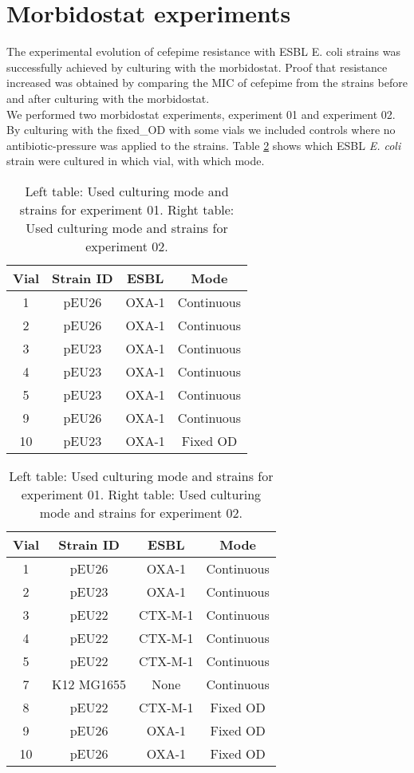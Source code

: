 \section{Morbidostat experiments}
The experimental evolution of cefepime resistance with ESBL E. coli strains was successfully achieved by culturing with the morbidostat. Proof that resistance increased was obtained by comparing the MIC of cefepime from the strains before and after culturing with the morbidostat. \\
We performed two morbidostat experiments, experiment 01 and experiment 02. By culturing with the fixed\_OD with some vials we included controls where no antibiotic-pressure was applied to the strains. Table \ref{table:vial_modes} shows which ESBL \textit{E. coli} strain were cultured in which vial, with which mode. 
\begin{table}
	\begin{tabular}{|c c c c|}	
		\hline
		Vial & Strain ID & ESBL & Mode \\
		\hline
		1 & pEU26 & OXA-1 & Continuous \\
		\hline
		2 & pEU26 & OXA-1 & Continuous \\
		\hline
		3 & pEU23 & OXA-1 & Continuous \\
		\hline
		4 & pEU23 & OXA-1 & Continuous \\
		\hline
		5 & pEU23 & OXA-1 & Continuous \\
		\hline
		9 & pEU26 & OXA-1 & Continuous \\
		\hline
		10 & pEU23 & OXA-1 & Fixed OD \\
		\hline
	\end{tabular}
	\quad
	\begin{tabular}{|c c c c|}	
		\hline
		Vial & Strain ID & ESBL &Mode \\
		\hline
		1 & pEU26 & OXA-1 & Continuous \\
		\hline
		2 & pEU23 & OXA-1 & Continuous \\
		\hline
		3 & pEU22 & CTX-M-1 & Continuous \\
		\hline
		4 & pEU22 & CTX-M-1 & Continuous \\
		\hline
		5 & pEU22 & CTX-M-1 & Continuous \\
		\hline
		7 & K12 MG1655& None & Continuous \\
		\hline
		8 & pEU22 & CTX-M-1 & Fixed OD \\
		\hline
		9 & pEU26 & OXA-1 & Fixed OD \\
		\hline
		10 & pEU26 & OXA-1 & Fixed OD \\
		\hline
	\end{tabular}
	\caption{Left table: Used culturing mode and strains for experiment 01. Right table: Used culturing mode and strains for experiment 02.}
	\label{table:vial_modes}
\end{table}
